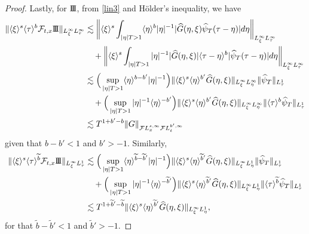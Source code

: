 \documentclass[%
11pt,  reqno]{amsart}
\newcommand{\jap}[1]{\langle #1 \rangle}
\newcommand{\III}{\textup{I \hspace{-2.9mm} I \hspace{-2.9mm} I}}
\newcommand{\5}{\textup{V}}
\newcommand{\FL}{\mathcal{F} L}
\newcommand{\ft}{\widehat}
\newcommand{\les}{\lesssim}
\newcommand{\F}{\mathcal{F}}
\newcommand{\wt}{\widetilde}
\theoremstyle{remark}
\numberwithin{equation}{section}
\numberwithin{theorem}{section}
\begin{document}
\begin{proof}
			Lastly, for $\III$, from \eqref{lin3} and H\"older's inequality, we have
			\begin{equation}
				\begin{aligned}
					\| \jap{\xi}^s \jap{\tau}^b \F_{t,x} \III \|_{L^\infty_\xi L^\infty_\tau} & \les \bigg\| \jap{\xi}^s \int_{|\eta|T >1} \jap{\eta}^b |\eta|^{-1} |\ft{G}(\eta, \xi) \ft{\psi}_T(\tau-\eta) | d\eta \bigg\|_{L^\infty_\xi L^\infty_\tau} \\
					& \quad + \bigg\| \jap{\xi}^s \int_{|\eta|T >1}  |\eta|^{-1} |\ft{G}(\eta, \xi)| \jap{\tau - \eta}^b | \ft{\psi}_T(\tau-\eta) | d\eta \bigg\|_{L^\infty_\xi L^\infty_\tau} \\
					& \les \Big( \sup_{|\eta|T>1} \jap{\eta}^{b-b'} |\eta|^{-1} \Big) \| \jap{\xi}^s \jap{\eta}^{b'} \ft{G}(\eta, \xi) \|_{L^\infty_\xi L^\infty_\eta} \| \ft{\psi}_T \|_{L^1_\tau} \\
					& \quad + \Big( \sup_{|\eta|T>1} |\eta|^{-1} \jap{\eta }^{-b'} \Big)  \| \jap{\xi}^s \jap{\eta}^{b'} \ft{G}(\eta, \xi) \|_{L^\infty_\xi L^\infty_\eta} \| \jap{\tau}^{b} \ft{\psi}_T \|_{L^1_\tau } \\
					& \les T^{1+b'-b} \| G\|_{\FL^{s, \infty}_x \FL^{b', \infty}_t}
				\end{aligned}
				\label{lin6a}
			\end{equation}
			given that $b-b' < 1 $ and $b'>-1$.
			Similarly, 
			\begin{equation}
				\begin{aligned}
					\| \jap{\xi}^s \jap{\tau}^{\wt{b}} \F_{t,x} \III \|_{L^\infty_\xi L^1_\tau} 
					& \les \Big( \sup_{|\eta|T>1} \jap{\eta}^{\wt{b}-\wt{b}'} |\eta|^{-1} \Big) \| \jap{\xi}^s \jap{\eta}^{\wt{b}'} \ft{G}(\eta, \xi) \|_{L^\infty_\xi L^1_\eta} \| \ft{\psi}_T \|_{L^1_\tau} \\
					& \quad + \Big( \sup_{|\eta|T>1} |\eta|^{-1} \jap{\eta }^{-\wt{b}'} \Big)  \| \jap{\xi}^s \jap{\eta}^{\wt{b}'} \ft{G}(\eta, \xi) \|_{L^\infty_\xi L^1_\eta} \| \jap{\tau}^{\wt{b}} \ft{\psi}_T \|_{L^1_\tau } \\
					& \les T^{1+\wt{b}'-\wt{b}} \| \jap{\xi}^s \jap{\eta}^{\wt{b}'} \ft{G}(\eta, \xi) \|_{L^\infty_\xi L^1_\eta}, 
				\end{aligned}
				\label{lin6c}
			\end{equation}
			for that $\wt b- \wt b' < 1 $ and $\wt b'>-1$.


\end{proof}
\end{document}
